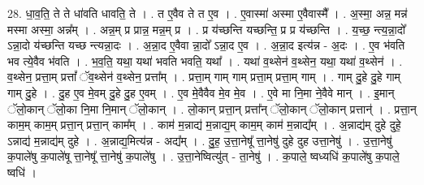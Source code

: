 \documentclass[17pt]{extarticle}
\begin{document}
28. धा॒व॒ति॒ ते ते धा॑वति धावति॒ ते । . त ए॒वैव ते त ए॒व । . ए॒वास्मा॑ अस्मा ए॒वैवास्मै᳚ । . अ॒स्मा॒ अन्न॒ मन्न॑ मस्मा अस्मा॒ अन्न᳚म् । . अन्न॒म् प्र प्रान्न॒ मन्न॒म् प्र । . प्र य॑च्छन्ति यच्छन्ति॒ प्र प्र य॑च्छन्ति । . य॒च्छ॒ न्त्य॒न्ना॒दो᳚ ऽन्ना॒दो य॑च्छन्ति यच्छ न्त्यन्ना॒दः । . अ॒न्ना॒द ए॒वैवा न्ना॒दो᳚ ऽन्ना॒द ए॒व । . अ॒न्ना॒द इत्य॑न्न - अ॒दः । . ए॒व भ॑वति भव त्ये॒वैव भ॑वति । . भ॒व॒ति॒ यथा॒ यथा॑ भवति भवति॒ यथा᳚ । . यथा॑ व॒थ्सेन॑ व॒थ्सेन॒ यथा॒ यथा॑ व॒थ्सेन॑ । . व॒थ्सेन॒ प्रत्ता॒म् प्रत्तां᳚ ॅव॒थ्सेन॑ व॒थ्सेन॒ प्रत्ता᳚म् । . प्रत्ता॒म् गाम् गाम् प्रत्ता॒म् प्रत्ता॒म् गाम् । . गाम् दु॒हे दु॒हे गाम् गाम् दु॒हे । . दु॒ह ए॒व मे॒वम् दु॒हे दु॒ह ए॒वम् । . ए॒व मे॒वैवैव मे॒व मे॒व । . ए॒वे मा नि॒मा ने॒वैवे मान् । . इ॒मान् ॅलो॒कान् ॅलो॒का नि॒मा नि॒मान् ॅलो॒कान् । . लो॒कान् प्रत्ता॒न् प्रत्ता᳚न् ॅलो॒कान् ॅलो॒कान् प्रत्तान्॑ । . प्रत्ता॒न् काम॒म् काम॒म् प्रत्ता॒न् प्रत्ता॒न् काम᳚म् । . काम॑ म॒न्नाद्य॑ म॒न्नाद्य॒म् काम॒म् काम॑ म॒न्नाद्य᳚म् । . अ॒न्नाद्य॑म् दुहे दुहे॒ ऽन्नाद्य॑ म॒न्नाद्य॑म् दुहे । . अ॒न्नाद्य॒मित्य॑न्न - अद्य᳚म् । . दु॒ह॒ उ॒त्ता॒नेषू᳚ त्ता॒नेषु॑ दुहे दुह उत्ता॒नेषु॑ । . उ॒त्ता॒नेषु॑ क॒पाले॑षु क॒पाले॑षू त्ता॒नेषू᳚ त्ता॒नेषु॑ क॒पाले॑षु । . उ॒त्ता॒नेष्वित्यु॑त् - ता॒नेषु॑ । . क॒पाले॒ ष्वध्यधि॑ क॒पाले॑षु क॒पाले॒ ष्वधि॑ । \newline
\end{document}
